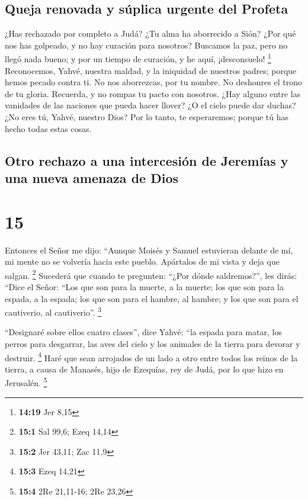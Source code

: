 \hypertarget{queja-renovada-y-suxfaplica-urgente-del-profeta}{%
\subsection{Queja renovada y súplica urgente del
Profeta}\label{queja-renovada-y-suxfaplica-urgente-del-profeta}}

 ¿Has rechazado por completo a Judá? ¿Tu alma ha
aborrecido a Sión? ¿Por qué nos has golpeado, y no hay curación para
nosotros? Buscamos la paz, pero no llegó nada bueno; y por un tiempo de
curación, y he aquí, ¡desconsuelo! \footnote{\textbf{14:19} Jer 8,15}
 Reconocemos, Yahvé, nuestra maldad, y la iniquidad de
nuestros padres; porque hemos pecado contra ti.  No nos
aborrezcas, por tu nombre. No deshonres el trono de tu gloria. Recuerda,
y no rompas tu pacto con nosotros.  ¿Hay alguno entre las
vanidades de las naciones que pueda hacer llover? ¿O el cielo puede dar
duchas? ¿No eres tú, Yahvé, nuestro Dios? Por lo tanto, te esperaremos;
porque tú has hecho todas estas cosas.

\hypertarget{otro-rechazo-a-una-intercesiuxf3n-de-jeremuxedas-y-una-nueva-amenaza-de-dios}{%
\subsection{Otro rechazo a una intercesión de Jeremías y una nueva
amenaza de
Dios}\label{otro-rechazo-a-una-intercesiuxf3n-de-jeremuxedas-y-una-nueva-amenaza-de-dios}}

\hypertarget{section-14}{%
\section{15}\label{section-14}}

 Entonces el Señor me dijo: ``Aunque Moisés y Samuel
estuvieran delante de mí, mi mente no se volvería hacia este pueblo.
Apártalos de mi vista y deja que salgan. \footnote{\textbf{15:1} Sal
  99,6; Ezeq 14,14}  Sucederá que cuando te pregunten:
``¿Por dónde saldremos?'', les dirás: ``Dice el Señor: ``Los que son
para la muerte, a la muerte; los que son para la espada, a la espada;
los que son para el hambre, al hambre; y los que son para el cautiverio,
al cautiverio''. \footnote{\textbf{15:2} Jer 43,11; Zac 11,9}

 ``Designaré sobre ellos cuatro clases'', dice Yahvé: ``la
espada para matar, los perros para desgarrar, las aves del cielo y los
animales de la tierra para devorar y destruir. \footnote{\textbf{15:3}
  Ezeq 14,21}  Haré que sean arrojados de un lado a otro
entre todos los reinos de la tierra, a causa de Manasés, hijo de
Ezequías, rey de Judá, por lo que hizo en Jerusalén. \footnote{\textbf{15:4}
  2Re 21,11-16; 2Re 23,26}

